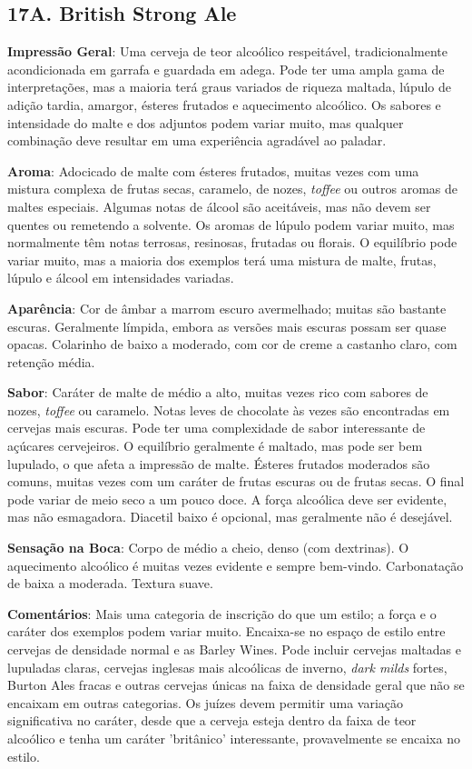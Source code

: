 \subsection*{17A. British Strong Ale}
\textbf{Impressão Geral}: Uma cerveja de teor alcoólico respeitável, tradicionalmente acondicionada em garrafa e guardada em adega. Pode ter uma ampla gama de interpretações, mas a maioria terá graus variados de riqueza maltada, lúpulo de adição tardia, amargor, ésteres frutados e aquecimento alcoólico. Os sabores e intensidade do malte e dos adjuntos podem variar muito, mas qualquer combinação deve resultar em uma experiência agradável ao paladar.

\textbf{Aroma}: Adocicado de malte com ésteres frutados, muitas vezes com uma mistura complexa de frutas secas, caramelo, de nozes, \textit{toffee} ou outros aromas de maltes especiais. Algumas notas de álcool são aceitáveis, mas não devem ser quentes ou remetendo a solvente. Os aromas de lúpulo podem variar muito, mas normalmente têm notas terrosas, resinosas, frutadas ou florais. O equilíbrio pode variar muito, mas a maioria dos exemplos terá uma mistura de malte, frutas, lúpulo e álcool em intensidades variadas.

\textbf{Aparência}: Cor de âmbar a marrom escuro avermelhado; muitas são bastante escuras. Geralmente límpida, embora as versões mais escuras possam ser quase opacas. Colarinho de baixo a moderado, com cor de creme a castanho claro, com retenção média.

\textbf{Sabor}: Caráter de malte de médio a alto, muitas vezes rico com sabores de nozes, \textit{toffee} ou caramelo. Notas leves de chocolate às vezes são encontradas em cervejas mais escuras. Pode ter uma complexidade de sabor interessante de açúcares cervejeiros. O equilíbrio geralmente é maltado, mas pode ser bem lupulado, o que afeta a impressão de malte. Ésteres frutados moderados são comuns, muitas vezes com um caráter de frutas escuras ou de frutas secas. O final pode variar de meio seco a um pouco doce. A força alcoólica deve ser evidente, mas não esmagadora. Diacetil baixo é opcional, mas geralmente não é desejável.

\textbf{Sensação na Boca}: Corpo de médio a cheio, denso (com dextrinas). O aquecimento alcoólico é muitas vezes evidente e sempre bem-vindo. Carbonatação de baixa a moderada. Textura suave.

\textbf{Comentários}: Mais uma categoria de inscrição do que um estilo; a força e o caráter dos exemplos podem variar muito. Encaixa-se no espaço de estilo entre cervejas de densidade normal e as Barley Wines. Pode incluir cervejas maltadas e lupuladas claras, cervejas inglesas mais alcoólicas de inverno, \textit{dark milds} fortes, Burton Ales fracas e outras cervejas únicas na faixa de densidade geral que não se encaixam em outras categorias. Os juízes devem permitir uma variação significativa no caráter, desde que a cerveja esteja dentro da faixa de teor alcoólico e tenha um caráter 'britânico' interessante, provavelmente se encaixa no estilo.

